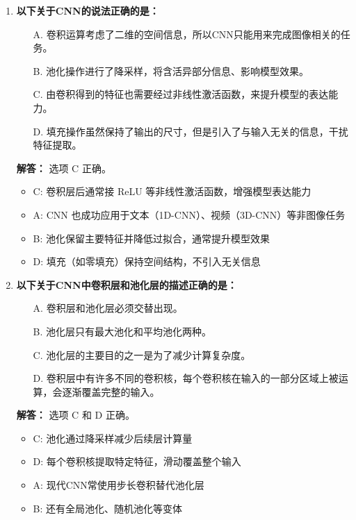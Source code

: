 \documentclass[a4paper,12pt]{book}
\begin{document}
\begin{enumerate}[label=\arabic*.]
    \item \textbf{以下关于CNN的说法正确的是：}
    \begin{itemize}
        \item[A.] 卷积运算考虑了二维的空间信息，所以CNN只能用来完成图像相关的任务。
        \item[B.] 池化操作进行了降采样，将含活异部分信息、影响模型效果。
        \item[C.] 由卷积得到的特征也需要经过非线性激活函数，来提升模型的表达能力。
        \item[D.] 填充操作虽然保持了输出的尺寸，但是引入了与输入无关的信息，干扰特征提取。
    \end{itemize}
    
    \textbf{解答：} 选项 C 正确。\\
    \begin{itemize}
        \item C: 卷积层后通常接 ReLU 等非线性激活函数，增强模型表达能力
        \item A: CNN 也成功应用于文本（1D-CNN）、视频（3D-CNN）等非图像任务
        \item B: 池化保留主要特征并降低过拟合，通常提升模型效果
        \item D: 填充（如零填充）保持空间结构，不引入无关信息
    \end{itemize}
    
    \item \textbf{以下关于CNN中卷积层和池化层的描述正确的是：}
    \begin{itemize}
        \item[A.] 卷积层和池化层必须交替出现。
        \item[B.] 池化层只有最大池化和平均池化两种。
        \item[C.] 池化层的主要目的之一是为了减少计算复杂度。
        \item[D.] 卷积层中有许多不同的卷积核，每个卷积核在输入的一部分区域上被运算，会逐渐覆盖完整的输入。
    \end{itemize}
    
    \textbf{解答：} 选项 C 和 D 正确。\\
    \begin{itemize}
        \item C: 池化通过降采样减少后续层计算量
        \item D: 每个卷积核提取特定特征，滑动覆盖整个输入
        \item A: 现代CNN常使用步长卷积替代池化层
        \item B: 还有全局池化、随机池化等变体
    \end{itemize}
    

\end{enumerate}
\end{document}
